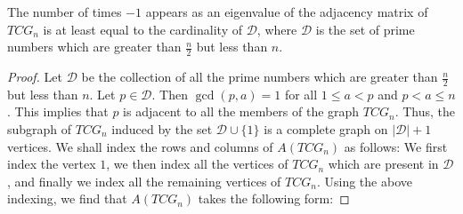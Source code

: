 \documentclass[10pt,a4paper]{amsart}
\begin{document}
	\begin{theorem}
		\label{number}
		The number of times $-1$ appears as an eigenvalue of the adjacency matrix of $TCG_n$ is at least equal to the cardinality of $\mathcal{D}$, where $\mathcal{D}$ is the set of prime numbers which are greater than $\frac{n}{2}$ but less than $n$. 
	\end{theorem}

	\begin{proof}
		Let $\mathcal{D}$ be the collection of all the prime numbers which are greater than $\frac{n}{2}$ but less than $n$. Let $p\in \mathcal{D}$. 
		Then $\gcd(p,a)=1$ for all $1\le a< p$ and $p<a\le n$.
		This implies that $p$ is adjacent to all the members of the graph $TCG_n$.
		Thus, the subgraph of $TCG_n$ induced by the set $\mathcal{D}\cup \{1\}$ is a complete graph on $|\mathcal{D}|+1$ vertices.
		We shall index the rows and columns of $A(TCG_n)$ as follows:
		We first index the vertex $1$, we then index all the vertices of $TCG_n$ which are present in $\mathcal{D}$, and finally we index all the remaining vertices of 
		$TCG_n$.
		Using the above indexing, we find that $A(TCG_n)$ takes the following form:
		

\end{proof}
\end{document}
